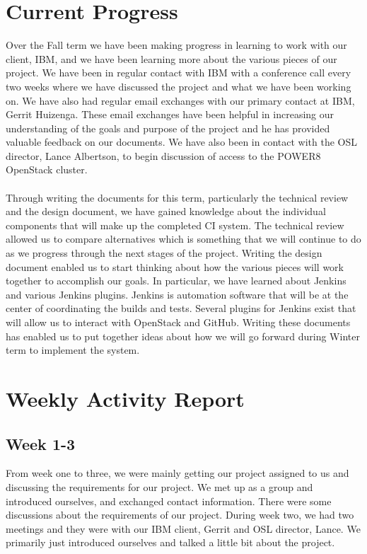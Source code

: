 \documentclass[10pt,onecolumn,journal,draftclsnofoot]{IEEEtran}
\begin{document}
\section{Current Progress}
Over the Fall term we have been making progress in learning to work with our client, IBM, and we have been learning more about the various pieces of our project.
We have been in regular contact with IBM with a conference call every two weeks where we have discussed the project and what we have been working on.
We have also had regular email exchanges with our primary contact at IBM, Gerrit Huizenga.
These email exchanges have been helpful in increasing our understanding of the goals and purpose of the project and he has provided valuable feedback on our documents.
We have also been in contact with the OSL director, Lance Albertson, to begin discussion of access to the POWER8 OpenStack cluster.
\\
\\
Through writing the documents for this term, particularly the technical review and the design document, we have gained knowledge about the individual components that will make up the completed CI system.
The technical review allowed us to compare alternatives which is something that we will continue to do as we progress through the next stages of the project.
Writing the design document enabled us to start thinking about how the various pieces will work together to accomplish our goals.
In particular, we have learned about Jenkins and various Jenkins plugins.
Jenkins is automation software that will be at the center of coordinating the builds and tests.
Several plugins for Jenkins exist that will allow us to interact with OpenStack and GitHub.
Writing these documents has enabled us to put together ideas about how we will go forward during Winter term to implement the system.

\section{Weekly Activity Report}
\subsection{Week 1-3} 
From week one to three, we were mainly getting our project assigned to us and discussing the requirements for our project. We met up as a group and introduced ourselves, and exchanged contact information. There were some discussions about the requirements of our project. During week two, we had two meetings and they were with our IBM client, Gerrit and OSL director, Lance. We primarily just introduced ourselves and talked a little bit about the project. 
\end{document}
